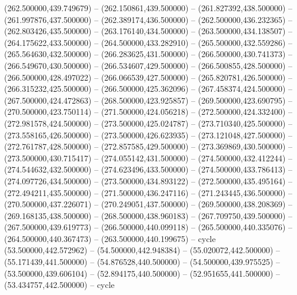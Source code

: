    (262.500000,439.749679) -- (262.150861,439.500000) -- (261.827392,438.500000) -- (261.997876,437.500000) -- (262.389174,436.500000) -- (262.500000,436.232365) -- (262.803426,435.500000) -- (263.176140,434.500000) -- (263.500000,434.138507) -- (264.175622,433.500000) -- (264.500000,433.282910) -- (265.500000,432.559286) -- (265.564630,432.500000) -- (266.283625,431.500000) -- (266.500000,430.741373) -- (266.549670,430.500000) -- (266.534607,429.500000) -- (266.500855,428.500000) -- (266.500000,428.497022) -- (266.066539,427.500000) -- (265.820781,426.500000) -- (266.315232,425.500000) -- (266.500000,425.362096) -- (267.458374,424.500000) -- (267.500000,424.472863) -- (268.500000,423.925857) -- (269.500000,423.690795) -- (270.500000,423.750114) -- (271.500000,424.056218) -- (272.500000,424.332400) -- (272.981578,424.500000) -- (273.500000,425.024787) -- (273.710340,425.500000) -- (273.558165,426.500000) -- (273.500000,426.623935) -- (273.121048,427.500000) -- (272.761787,428.500000) -- (272.857585,429.500000) -- (273.369869,430.500000) -- (273.500000,430.715417) -- (274.055142,431.500000) -- (274.500000,432.412244) -- (274.544632,432.500000) -- (274.623496,433.500000) -- (274.500000,433.786413) -- (274.097726,434.500000) -- (273.500000,434.893122) -- (272.500000,435.495164) -- (272.494211,435.500000) -- (271.500000,436.247116) -- (271.243445,436.500000) -- (270.500000,437.226071) -- (270.249051,437.500000) -- (269.500000,438.208369) -- (269.168135,438.500000) -- (268.500000,438.960183) -- (267.709750,439.500000) -- (267.500000,439.619773) -- (266.500000,440.099118) -- (265.500000,440.335076) -- (264.500000,440.367473) -- (263.500000,440.199675) -- cycle
   (53.500000,442.572962) -- (54.500000,442.948384) -- (55.020072,442.500000) -- (55.171439,441.500000) -- (54.876528,440.500000) -- (54.500000,439.975525) -- (53.500000,439.606104) -- (52.894175,440.500000) -- (52.951655,441.500000) -- (53.434757,442.500000) -- cycle
